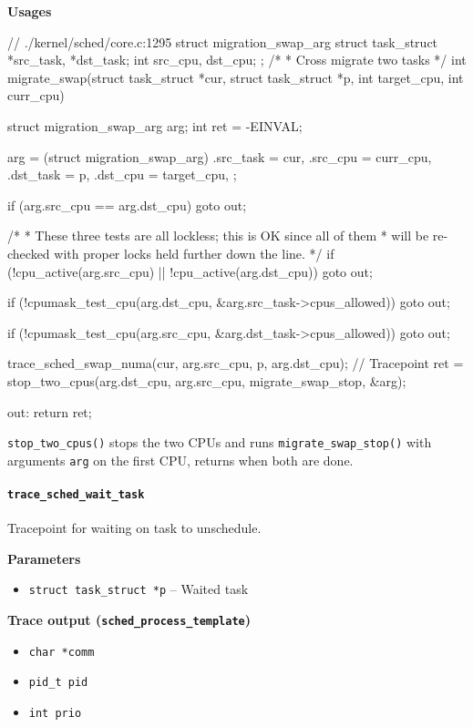 \textbf{Usages}
\begin{code}
// ./kernel/sched/core.c:1295
struct migration_swap_arg {
	struct task_struct *src_task, *dst_task;
	int src_cpu, dst_cpu;
};
/*
 * Cross migrate two tasks
 */
int migrate_swap(struct task_struct *cur, struct task_struct *p,
		int target_cpu, int curr_cpu){
	struct migration_swap_arg arg;
	int ret = -EINVAL;

	arg = (struct migration_swap_arg){
		.src_task = cur,
		.src_cpu = curr_cpu,
		.dst_task = p,
		.dst_cpu = target_cpu,
	};

	if (arg.src_cpu == arg.dst_cpu)
		goto out;

	/*
	 * These three tests are all lockless; this is OK since all of them
	 * will be re-checked with proper locks held further down the line.
	 */
	if (!cpu_active(arg.src_cpu) || !cpu_active(arg.dst_cpu))
		goto out;

	if (!cpumask_test_cpu(arg.dst_cpu, &arg.src_task->cpus_allowed))
		goto out;

	if (!cpumask_test_cpu(arg.src_cpu, &arg.dst_task->cpus_allowed))
		goto out;

	trace_sched_swap_numa(cur, arg.src_cpu, p, arg.dst_cpu); // Tracepoint
	ret = stop_two_cpus(arg.dst_cpu, arg.src_cpu, migrate_swap_stop, &arg);

out:
	return ret;
}
\end{code}
\verb|stop_two_cpus()| stops the two CPUs and runs \verb|migrate_swap_stop()| with arguments \verb|arg| on the first CPU, returns when both are done.

\paragraph{\texttt{trace\_sched\_wait\_task}}
Tracepoint for waiting on task to unschedule.

\textbf{Parameters}
\begin{itemize}
    \item \verb|struct task_struct *p| -- Waited task
\end{itemize}

\textbf{Trace output (\texttt{sched\_process\_template})}
\begin{itemize}
    \item \verb|char *comm|
    \item \verb|pid_t pid|
    \item \verb|int prio|
\end{itemize}


